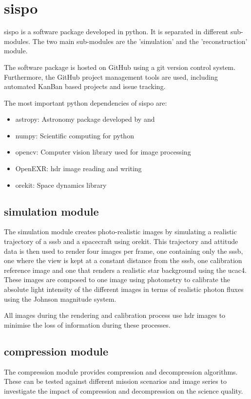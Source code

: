 \section{\Acrlong{sispo}}

\gls{sispo} is a software package developed in python. It is separated in different sub-modules. The two main sub-modules are the 'simulation' and the 'reconstruction' module.

The software package is hosted on GitHub using a git version control system. Furthermore, the GitHub project management tools are used, including automated KanBan based projects and issue tracking.

The most important python dependencies of \gls{sispo} are:
\begin{itemize}
    \item astropy: Astronomy package developed by \cite{robitaille2013astropy} and \cite{price2018astropy}
    \item numpy: Scientific computing for python
    \item opencv: Computer vision library used for image processing
    \item OpenEXR: \gls{hdr} image reading and writing
    \item orekit: Space dynamics library
\end{itemize}

\subsection{simulation module}
The simulation module creates photo-realistic images by simulating a realistic trajectory of a \gls{sssb} and a spacecraft using orekit. This trajectory and attitude data is then used to render four images per frame, one containing only the \gls{sssb}, one where the view is kept at a constant distance from the \gls{sssb}, one calibration reference image and one that renders a realistic star background using the \gls{ucac4}. These images are composed to one image using photometry to calibrate the absolute light intensity of the different images in terms of realistic photon fluxes using the Johnson magnitude system.

All images during the rendering and calibration process use \gls{hdr} images to minimise the loss of information during these processes.

\subsection{compression module}
The compression module provides compression and decompression algorithms. These can be tested against different mission scenarios and image series to investigate the impact of compression and decompression on the science quality.

